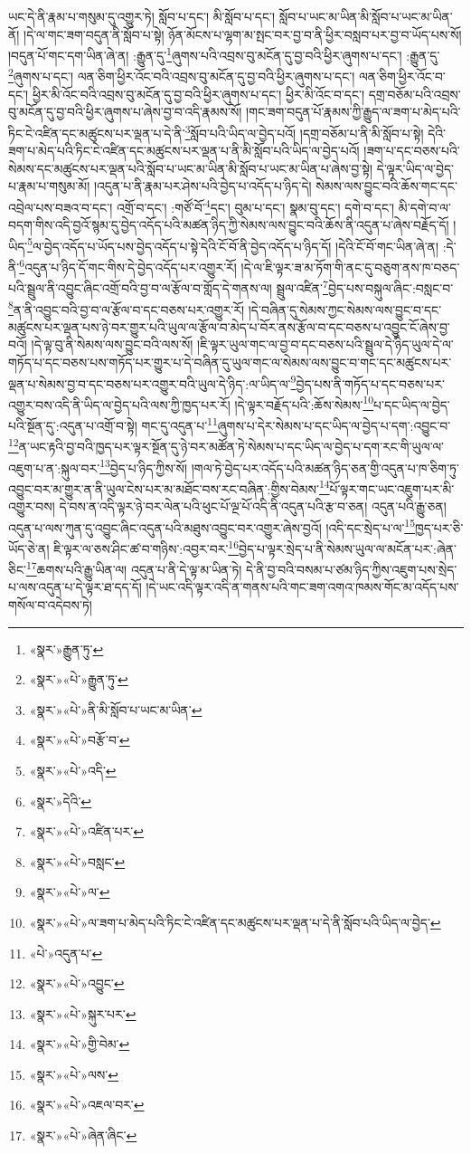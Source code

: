 ཡང་དེ་ནི་རྣམ་པ་གསུམ་དུ་འགྱུར་ཏེ། སློབ་པ་དང་། མི་སློབ་པ་དང་། སློབ་པ་ཡང་མ་ཡིན་མི་སློབ་པ་ཡང་མ་ཡིན་ནོ། །དེ་ལ་གང་ཟག་བདུན་ནི་སློབ་པ་སྟེ། ཉོན་མོངས་པ་ལྷག་མ་སྤང་བར་བྱ་བ་ནི་ཕྱིར་བསླབ་པར་བྱ་བ་ཡོད་པས་སོ། །བདུན་པོ་གང་དག་ཡིན་ཞེ་ན། :རྒྱུན་དུ་\footnote{«སྣར་»རྒྱུན་ཏུ་}ཞུགས་པའི་འབྲས་བུ་མངོན་དུ་བྱ་བའི་ཕྱིར་ཞུགས་པ་དང་། :རྒྱུན་དུ་\footnote{«སྣར་»«པེ་»རྒྱུན་ཏུ་}ཞུགས་པ་དང་། ལན་ཅིག་ཕྱིར་འོང་བའི་འབྲས་བུ་མངོན་དུ་བྱ་བའི་ཕྱིར་ཞུགས་པ་དང་། ལན་ཅིག་ཕྱིར་འོང་བ་དང་། ཕྱིར་མི་འོང་བའི་འབྲས་བུ་མངོན་དུ་བྱ་བའི་ཕྱིར་ཞུགས་པ་དང་། ཕྱིར་མི་འོང་བ་དང་། དགྲ་བཅོམ་པའི་འབྲས་བུ་མངོན་དུ་བྱ་བའི་ཕྱིར་ཞུགས་པ་ཞེས་བྱ་བ་འདི་རྣམས་སོ། །གང་ཟག་བདུན་པོ་རྣམས་ཀྱི་རྒྱུད་ལ་ཟག་པ་མེད་པའི་ཏིང་ངེ་འཛིན་དང་མཚུངས་པར་ལྡན་པ་དེ་ནི་\footnote{«སྣར་»«པེ་»ནི་མི་སློབ་པ་ཡང་མ་ཡིན་}སློབ་པའི་ཡིད་ལ་བྱེད་པའོ། །དགྲ་བཅོམ་པ་ནི་མི་སློབ་པ་སྟེ། དེའི་ཟག་པ་མེད་པའི་ཏིང་ངེ་འཛིན་དང་མཚུངས་པར་ལྡན་པ་ནི་མི་སློབ་པའི་ཡིད་ལ་བྱེད་པའོ། །ཟག་པ་དང་བཅས་པའི་སེམས་དང་མཚུངས་པར་ལྡན་པའི་སློབ་པ་ཡང་མ་ཡིན་མི་སློབ་པ་ཡང་མ་ཡིན་པ་ཞེས་བྱ་སྟེ། དེ་ལྟར་ཡིད་ལ་བྱེད་པ་རྣམ་པ་གསུམ་མོ། །འདུན་པ་ནི་རྣམ་པར་ཤེས་པའི་བྱེད་པ་འདོད་པ་ཉིད་དེ། སེམས་ལས་བྱུང་བའི་ཆོས་གང་དང་འབྲེལ་པས་བཟའ་བ་དང་། འགྲོ་བ་དང་། :གཙོ་བོ་\footnote{«སྣར་»«པེ་»བརྩོ་བ་}དང་། བུམ་པ་དང་། སྣམ་བུ་དང་། དགེ་བ་དང་། མི་དགེ་བ་ལ་བདག་གིས་འདི་བྱའོ་སྙམ་དུ་བྱེད་འདོད་པའི་མཚན་ཉིད་ཀྱི་སེམས་ལས་བྱུང་བའི་ཆོས་ནི་འདུན་པ་ཞེས་བརྗོད་དོ། །ཡིད་\footnote{«སྣར་»«པེ་»འདི་}ལ་བྱེད་འདོད་པ་ཡོད་པས་བྱེད་འདོད་པ་སྟེ་དེའི་ངོ་བོ་ནི་བྱེད་འདོད་པ་ཉིད་དོ། །དེའི་ངོ་བོ་གང་ཡིན་ཞེ་ན། :དེ་ནི་\footnote{«སྣར་»དེའི་}འདུན་པ་ཉིད་དོ་གང་གིས་དེ་བྱེད་འདོད་པར་འགྱུར་རོ། །དེ་ལ་ཇི་ལྟར་ཟ་མ་ཏོག་གི་ནང་དུ་བཅུག་ནས་ཁ་བཅད་པའི་སྦྲུལ་ནི་འབྱུང་ཞིང་འགྲོ་བའི་བྱ་བ་ལ་རྩོལ་བ་གློད་དེ་གནས་ལ། སྦྲུལ་འཛིན་\footnote{«སྣར་»«པེ་»འཛིན་པར་}བྱེད་པས་བསྐུལ་ཞིང་:བསླང་བ་\footnote{«སྣར་»«པེ་»བསླང་}ན་ནི་འབྱུང་བའི་བྱ་བ་ལ་རྩོལ་བ་དང་བཅས་པར་འགྱུར་རོ། །དེ་བཞིན་དུ་སེམས་ཀྱང་སེམས་ལས་བྱུང་བ་དང་མཚུངས་པར་ལྡན་པས་ཉེ་བར་གྱུར་པའི་ཡུལ་ལ་རྩོལ་བ་མེད་པ་བོར་ནས་རྩོལ་བ་དང་བཅས་པ་འབྱུང་ངོ་ཞེས་བྱ་བའོ། །དེ་ལྟ་བུ་ནི་སེམས་ལས་བྱུང་བའི་ལས་སོ། །ཇི་ལྟར་ཡུལ་གང་ལ་བྱ་བ་དང་བཅས་པའི་སྦྲུལ་དེ་ཉིད་ཡུལ་དེ་ལ་གཏོད་པ་དང་བཅས་པས་གཏོད་པར་གྱུར་པ་དེ་བཞིན་དུ་ཡུལ་གང་ལ་སེམས་ལས་བྱུང་བ་གང་དང་མཚུངས་པར་ལྡན་པ་སེམས་བྱ་བ་དང་བཅས་པར་འགྱུར་བའི་ཡུལ་དེ་ཉིད་:ལ་ཡིད་ལ་\footnote{«སྣར་»«པེ་»ལ་}བྱེད་པས་ནི་གཏོད་པ་དང་བཅས་པར་འགྱུར་བས་འདི་ནི་ཡིད་ལ་བྱེད་པའི་ལས་ཀྱི་ཁྱད་པར་རོ། །དེ་ལྟར་བརྗོད་པའི་:ཆོས་སེམས་\footnote{«སྣར་»«པེ་»ལ་ཟག་པ་མེད་པའི་ཏིང་ངེ་འཛིན་དང་མཚུངས་པར་ལྡན་པ་དེ་ནི་སློབ་པའི་ཡིད་ལ་བྱེད་}པ་དང་ཡིད་ལ་བྱེད་པའི་སྔོན་དུ་:འདུན་པ་འགྲོ་བ་སྟེ། གང་དུ་འདུན་པ་\footnote{«པེ་»འདུན་པ་}ཞུགས་པ་དེར་སེམས་པ་དང་ཡིད་ལ་བྱེད་པ་དག་:འབྱུང་བ་\footnote{«སྣར་»«པེ་»འབྱུང་}ན་ཡང་རྟའི་བྱ་བའི་ཁྱད་པར་ལྟར་སྔོན་དུ་ཉེ་བར་མཚོན་ཏེ་སེམས་པ་དང་ཡིད་ལ་བྱེད་པ་དག་རང་གི་ཡུལ་ལ་འཇུག་པ་ན་:སྐུལ་བར་\footnote{«སྣར་»«པེ་»སྐུར་པར་}བྱེད་པ་ཉིད་ཀྱིས་སོ། །གལ་ཏེ་བྱེད་པར་འདོད་པའི་མཚན་ཉིད་ཅན་གྱི་འདུན་པ་ཁ་ཅིག་ཏུ་འབྱུང་བར་མ་གྱུར་ན་ནི་ཡུལ་ངེས་པར་མ་མཐོང་བས་རང་བཞིན་:གྱིས་བེམས་\footnote{«སྣར་»«པེ་»གྱི་བེམ་}པོ་ལྟར་གང་ཡང་འཇུག་པར་མི་འགྱུར་བས། དེ་བས་ན་འདི་ལྟར་ཉེ་བར་ལེན་པའི་ཕུང་པོ་ལྔ་པོ་འདི་ནི་འདུན་པའི་རྩ་བ་ཅན། འདུན་པའི་རྒྱུ་ཅན། འདུན་པ་ལས་ཀུན་དུ་འབྱུང་ཞིང་འདུན་པའི་མཐུས་འབྱུང་བར་འགྱུར་ཞེས་བྱའོ། །འདི་དང་སྲེད་པ་ལ་\footnote{«སྣར་»«པེ་»ལས་}ཁྱད་པར་ཅི་ཡོད་ཅེ་ན། ཇི་ལྟར་ལ་ཅས་ཤིང་ཚ་བ་གཉིས་:འབྱར་བར་\footnote{«སྣར་»«པེ་»འཇལ་བར་}བྱེད་པ་ལྟར་སྲེད་པ་ནི་སེམས་ཡུལ་ལ་མངོན་པར་:ཞེན་ཅིང་\footnote{«སྣར་»«པེ་»ཞེན་ཞིང་}ཆགས་པའི་རྒྱུ་ཡིན་ལ། འདུན་པ་ནི་དེ་ལྟ་མ་ཡིན་ཏེ། དེ་ནི་བྱ་བའི་བསམ་པ་ཙམ་ཉིད་ཀྱིས་འཇུག་པས་སྲེད་པ་ལས་འདུན་པ་དེ་ལྟར་ཐ་དད་དོ། །དེ་ཡང་འདི་ལྟར་འདི་ན་གནས་པའི་གང་ཟག་འགའ་ཁམས་གོང་མ་འདོད་པས་གསོལ་བ་འདེབས་ཏེ། 